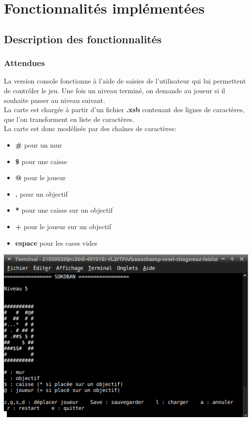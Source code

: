 \documentclass[a4paper,12pt]{article} %
\begin{document}
\section{Fonctionnalités implémentées}

\subsection{Description des fonctionnalités}

\subsubsection*{Attendues}

La version console fonctionne à l'aide de saisies de l'utilisateur qui lui permettent de contrôler le jeu. Une fois un niveau terminé, on demande au joueur si il souhaite passer au niveau suivant.\\

La carte est chargée à partir d'un fichier \textbf{.xsb} contenant des lignes de caractères, que l'on transforment en liste de caractères.\\
La carte est donc modélisée par des chaînes de caractères:
\begin{itemize}
\item \textbf{\#} pour un mur
\item \textbf{\$} pour une caisse
\item \textbf{@} pour le joueur
\item \textbf{.} pour un objectif
\item \textbf{*} pour une caisse sur un objectif
\item \textbf{+} pour le joueur sur un objectif
\item \textbf{espace} pour les cases vides
\end{itemize}

\begin{center}
\includegraphics[scale=0.6]{images/Capture.png}\\
\end{center}
\end{document}
